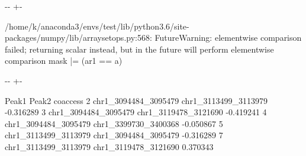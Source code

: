 \documentclass[letterpaper,10pt,english]{sphinxmanual}
\newlength\nbsphinxcodecellspacing
\begin{document}
{
\begin{sphinxVerbatim}[commandchars=\\\{\}]
\llap{\color{nbsphinxin}[4]:\,\hspace{\fboxrule}\hspace{\fboxsep}}
   
\end{sphinxVerbatim}
}

{

\kern-\sphinxverbatimsmallskipamount\kern-\baselineskip
\kern+\FrameHeightAdjust\kern-\fboxrule
\vspace{\nbsphinxcodecellspacing}

\begin{sphinxVerbatim}[commandchars=\\\{\}]
/home/k/anaconda3/envs/test/lib/python3.6/site-packages/numpy/lib/arraysetops.py:568: FutureWarning: elementwise comparison failed; returning scalar instead, but in the future will perform elementwise comparison
  mask |= (ar1 == a)
\end{sphinxVerbatim}
}

{

\kern-\sphinxverbatimsmallskipamount\kern-\baselineskip
\kern+\FrameHeightAdjust\kern-\fboxrule
\vspace{\nbsphinxcodecellspacing}

\begin{sphinxVerbatim}[commandchars=\\\{\}]
\llap{\color{nbsphinxout}[4]:\,\hspace{\fboxrule}\hspace{\fboxsep}}                  Peak1                 Peak2  coaccess
2  chr1\_3094484\_3095479  chr1\_3113499\_3113979 -0.316289
3  chr1\_3094484\_3095479  chr1\_3119478\_3121690 -0.419241
4  chr1\_3094484\_3095479  chr1\_3399730\_3400368 -0.050867
5  chr1\_3113499\_3113979  chr1\_3094484\_3095479 -0.316289
7  chr1\_3113499\_3113979  chr1\_3119478\_3121690  0.370343
\end{sphinxVerbatim}
}
\end{document}
